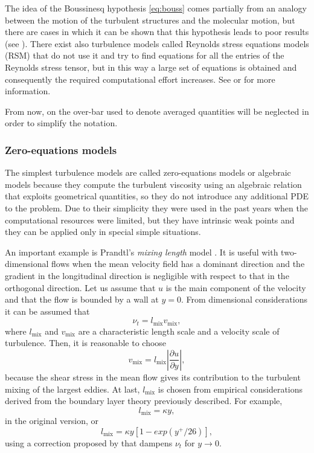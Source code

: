 The idea of the Boussinesq hypothesis \eqref{eq:bouss} comes partially from an 
analogy 
between the motion 
of the turbulent structures and the molecular motion, but there are cases in 
which it can be shown that this hypothesis leads to poor results (see 
\cite{main:pope}). There exist also turbulence models called Reynolds stress 
equations models (RSM) that do not use it and try to find equations for 
all the entries of the Reynolds stress tensor, but in this way a large set of 
equations is obtained and consequently the required computational effort 
increases. See \cite{main:pope} or \cite{main:vermal} for more information.

From now, on the over-bar used to denote averaged quantities will be 
neglected in order to simplify the notation.

\subsubsection{Zero-equations models}
The simplest turbulence models are called zero-equations models or algebraic 
models because they compute the turbulent viscosity using an algebraic relation 
that exploits geometrical quantities, so they do not introduce any additional 
PDE to the problem. Due to their simplicity they were used in the past years 
when the computational resources were limited, but they have intrinsic weak 
points and they can be applied only in special simple situations.

An important example is Prandtl's \emph{mixing length} model \cite{turbo:prandtl}. It is 
useful with two-dimensional flows when the mean velocity field has a dominant 
direction and the gradient in the longitudinal direction is negligible with 
respect to that in the orthogonal direction. Let us assume that $u$ is the 
main component of the velocity and that the flow is bounded by a wall at $y=0$. 
From dimensional considerations it can be assumed that
\begin{equation}
\nu_t = l_\text{mix}v_\text{mix},
\end{equation}
where $l_\text{mix}$ and $v_\text{mix}$ are a characteristic length scale and a 
velocity 
scale of turbulence. Then, it is reasonable to choose
\begin{equation}
	v_\text{mix} = l_\text{mix} \left\lvert \frac{\partial u}{\partial y} 
	\right\rvert,
\end{equation}
because the shear stress in the mean flow gives its contribution to the 
turbulent mixing of the largest eddies. At last, $l_\text{mix}$ is chosen from 
empirical considerations derived from the boundary layer theory previously 
described. For example,
\begin{equation}
l_\text{mix} = \kappa y,
\end{equation}
in the original version, or
\begin{equation}
l_\text{mix} = \kappa y[1 - exp(y^+ / 26)],
\end{equation}
using a correction proposed by \textcite{turbo:vandriest} that dampens $\nu_t$ for $y \rightarrow 0$.
%
